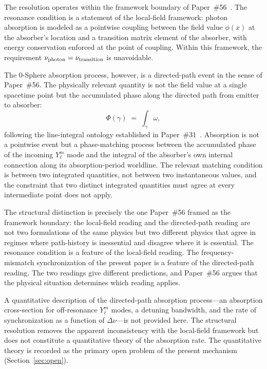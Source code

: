 \documentclass[%
 reprint, amsmath,amssymb, aps, prb, ]{revtex4-2}
\numberwithin{equation}{section}
\begin{document}
The resolution operates within the framework boundary of Paper~\#56~\cite{hanamura56}. The resonance condition is a statement of the local-field framework: photon absorption is modeled as a pointwise coupling between the field value $\phi(x)$ at the absorber's location and a transition matrix element of the absorber, with energy conservation enforced at the point of coupling. Within this framework, the requirement $\nu_{\rm photon} = \nu_{\rm transition}$ is unavoidable.

The 0-Sphere absorption process, however, is a directed-path event in the sense of Paper~\#56. The physically relevant quantity is not the field value at a single spacetime point but the accumulated phase along the directed path from emitter to absorber:
\begin{equation}
\Phi(\gamma) \;=\; \int_\gamma \omega,
\label{eq:line_integral}
\end{equation}
following the line-integral ontology established in Paper~\#31~\cite{hanamura31}. Absorption is not a pointwise event but a phase-matching process between the accumulated phase of the incoming $Y_\ell^m$ mode and the integral of the absorber's own internal connection along its absorption-period worldline. The relevant matching condition is between two integrated quantities, not between two instantaneous values, and the constraint that two distinct integrated quantities must agree at every intermediate point does not apply.

The structural distinction is precisely the one Paper~\#56 framed as the framework boundary: the local-field reading and the directed-path reading are not two formulations of the same physics but two different physics that agree in regimes where path-history is inessential and disagree where it is essential. The resonance condition is a feature of the local-field reading. The frequency-mismatch synchronization of the present paper is a feature of the directed-path reading. The two readings give different predictions, and Paper~\#56 argues that the physical situation determines which reading applies.

A quantitative description of the directed-path absorption process---an absorption cross-section for off-resonance $Y_\ell^m$ modes, a detuning bandwidth, and the rate of synchronization as a function of $\Delta\nu$---is not provided here. The structural resolution removes the apparent inconsistency with the local-field framework but does not constitute a quantitative theory of the absorption rate. The quantitative theory is recorded as the primary open problem of the present mechanism (Section~\ref{sec:open}).
\end{document}
